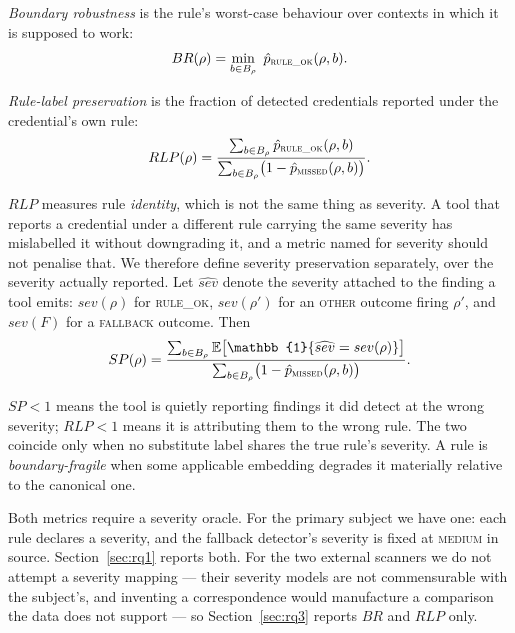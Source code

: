 \documentclass[journal]{IEEEtran}
\begin{document}
\emph{Boundary robustness} is the rule's worst-case behaviour over contexts in which it is supposed to work:
\begin{equation}
BR(\rho) = \min_{b \in B_\rho}\ \hat p_{\textsc{rule\_ok}}(\rho,b). \label{eq:br}
\end{equation}

\emph{Rule-label preservation} is the fraction of detected credentials reported under the credential's own rule:
\begin{equation}
RLP(\rho) = \frac{\sum_{b \in B_\rho} \hat p_{\textsc{rule\_ok}}(\rho,b)}
                 {\sum_{b \in B_\rho} \bigl(1-\hat p_{\textsc{missed}}(\rho,b)\bigr)}. \label{eq:rlp}
\end{equation}

$RLP$ measures rule \emph{identity}, which is not the same thing as severity. A tool that reports a credential under a different rule carrying the same severity has mislabelled it without downgrading it, and a metric named for severity should not penalise that. We therefore define severity preservation separately, over the severity actually reported. Let $\widehat{sev}$ denote the severity attached to the finding a tool emits: $sev(\rho)$ for \textsc{rule\_ok}, $sev(\rho')$ for an \textsc{other} outcome firing $\rho'$, and $sev(F)$ for a \textsc{fallback} outcome. Then
\begin{equation}
SP(\rho) = \frac{\sum_{b \in B_\rho} \mathbb{E}\bigl[\mathbb{1}\{\widehat{sev} = sev(\rho)\}\bigr]}
                {\sum_{b \in B_\rho} \bigl(1-\hat p_{\textsc{missed}}(\rho,b)\bigr)}. \label{eq:sp}
\end{equation}

$SP < 1$ means the tool is quietly reporting findings it did detect at the wrong severity; $RLP < 1$ means it is attributing them to the wrong rule. The two coincide only when no substitute label shares the true rule's severity. A rule is \emph{boundary-fragile} when some applicable embedding degrades it materially relative to the canonical one.

Both metrics require a severity oracle. For the primary subject we have one: each rule declares a severity, and the fallback detector's severity is fixed at \textsc{medium} in source. Section~\ref{sec:rq1} reports both. For the two external scanners we do not attempt a severity mapping --- their severity models are not commensurable with the subject's, and inventing a correspondence would manufacture a comparison the data does not support --- so Section~\ref{sec:rq3} reports $BR$ and $RLP$ only.
\end{document}
